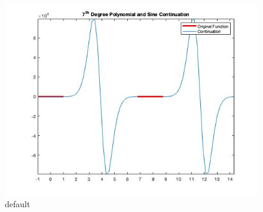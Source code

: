\documentclass[11pt]{amsart}
\begin{document}
\begin{figure}[htbp]
\begin{center}
\includegraphics[scale=0.5]{SeventhDegreeSineCont.jpg}
\caption{default}
\label{default}
\end{center}
\end{figure}
\end{document}
